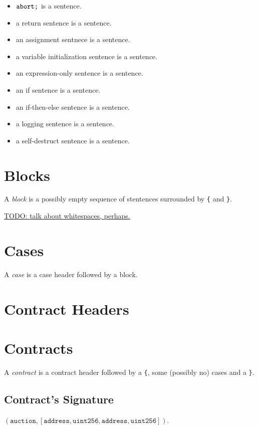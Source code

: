 \documentclass{book}
\newcommand{\todo}[1]{\underline{TODO: {#1}}}
\begin{document}
\begin{itemize}
\item $\text{\texttt{abort;}}$ is a sentence.
\item a return sentence is a sentence.
\item an assignment sentnece is a sentence.
\item a variable initialization sentence is a sentence.
\item an expression-only sentence is a sentence.
\item an if sentence is a sentence.
\item an if-then-else sentence is a sentence.
\item a logging sentence is a sentence.
\item a self-destruct sentence is a sentence.
\end{itemize}

\section{Blocks}

A \textit{block} is a possibly empty sequence of stentences surrounded by \texttt{\{} and \texttt{\}}.

\todo{talk about whitespaces, perhaps.}

\section{Cases}

A \textit{case} is a case header followed by a block.


\section{Contract Headers}

\section{Contracts}

A \textit{contract} is a contract header followed by a \texttt{\{}, some (possibly no) cases and a \texttt{\}}.

\subsection{Contract's Signature}

$(\mathtt{auction}, [\mathtt{address}, \mathtt{uint256}, \mathtt{address}, \mathtt{uint256}])$.
\end{document}
